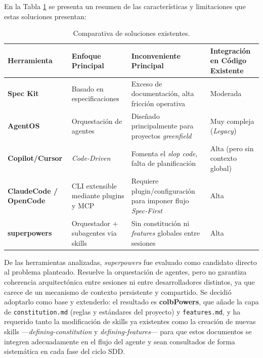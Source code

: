 \documentclass[11pt, letterpaper]{article}
\begin{document}
En la Tabla \ref{tab:comparativa_herramientas} se presenta un resumen de las características y limitaciones que estas soluciones presentan:

\begin{table}[H]
\centering
\begin{tabularx}{\textwidth}{>{\raggedright\arraybackslash}X >{\raggedright\arraybackslash}X >{\raggedright\arraybackslash}X >{\raggedright\arraybackslash}X}
    \toprule
    \textbf{Herramienta} & \textbf{Enfoque Principal} & \textbf{Inconveniente Principal} & \textbf{Integración en Código Existente} \\
    \midrule
    \textbf{Spec Kit} & Basado en especificaciones & Exceso de documentación, alta fricción operativa & Moderada \\
    \textbf{AgentOS} & Orquestación de agentes & Diseñado principalmente para proyectos \textit{greenfield} & Muy compleja (\textit{Legacy}) \\
    \textbf{Copilot/Cursor} & \textit{Code-Driven} & Fomenta el \textit{slop code}, falta de planificación & Alta (pero sin contexto global) \\
    \textbf{ClaudeCode / OpenCode} & CLI extensible mediante plugins y MCP & Requiere plugin/configuración para imponer flujo \textit{Spec-First} & Alta \\
    \textbf{superpowers} & Orquestador + subagentes via skills & Sin constitución ni \textit{features} globales entre sesiones & Alta \\
    \bottomrule
\end{tabularx}
\caption{Comparativa de soluciones existentes.}
\label{tab:comparativa_herramientas}
\end{table}

De las herramientas analizadas, \textit{superpowers} fue evaluado como candidato directo al problema planteado. Resuelve la orquestación de agentes, pero no garantiza coherencia arquitectónica entre sesiones ni entre desarrolladores distintos, ya que carece de un mecanismo de contexto persistente y compartido. Se decidió adoptarlo como base y extenderlo: el resultado es \textbf{colbPowers}, que añade la capa de \texttt{constitution.md} (reglas y estándares del proyecto) y \texttt{features.md}, y ha requerido tanto la modificación de skills ya existentes como la creación de nuevas skills ---\textit{defining-constitution} y \textit{defining-features}--- para que estos documentos se integren adecuadamente en el flujo del agente y sean consultados de forma sistemática en cada fase del ciclo SDD.
\end{document}
